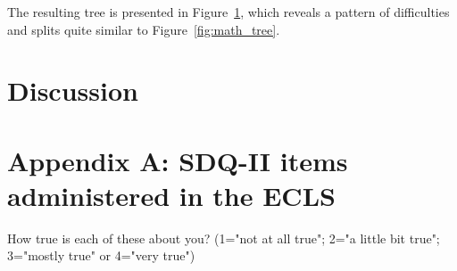 \documentclass[doc,floatsintext,natbib]{apa7}
\begin{document}
The resulting tree is presented in Figure~\ref{fig:read_tree}, which reveals a pattern of difficulties and splits quite similar to Figure~\ref{fig:math_tree}.

\begin{figure}%
\caption{Rasch tree for the four reading items.}
\begin{subfigure}{1.25\textwidth}
\end{subfigure}
\label{fig:read_tree}
\end{figure}




\FloatBarrier
\section{Discussion}













\newpage
\appendix



\section{Appendix A: SDQ-II items administered in the ECLS}
\label{sec:AppendixA}


How true is each of these about you? (1="not at all true"; 2="a little bit true"; 3="mostly true" or 4="very true")
\end{document}
